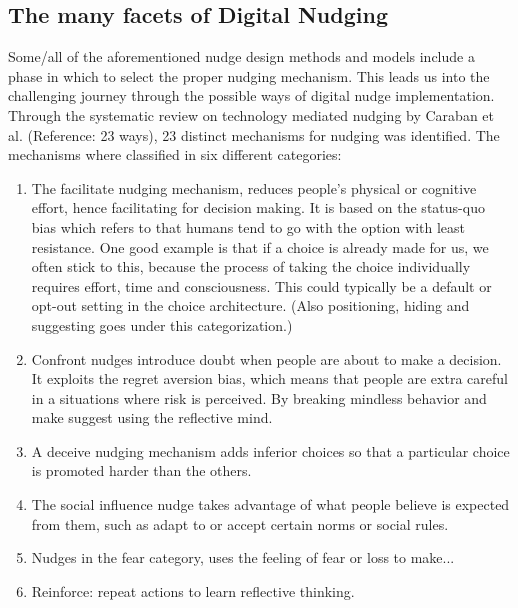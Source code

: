 
\subsection{The many facets of Digital Nudging}
Some/all of the aforementioned nudge design methods and models include a phase in which to select the proper nudging mechanism. This leads us into the challenging journey through the possible ways of digital nudge implementation. Through the systematic review on technology mediated nudging by Caraban et al. (Reference: 23 ways), 23 distinct mechanisms for nudging was identified. The mechanisms where classified in six different categories:

\begin{enumerate}
\item The facilitate nudging mechanism, reduces people's physical or cognitive effort, hence facilitating for decision making. It is based on the status-quo bias which refers to that humans tend to go with the option with least resistance. One good example is that if a choice is already made for us, we often stick to this, because the process of taking the choice individually requires effort, time and consciousness. This could typically be a default or opt-out setting in the choice architecture. (Also positioning, hiding and suggesting goes under this categorization.) 
\item Confront nudges introduce doubt when people are about to make a decision. It exploits the regret aversion bias, which means that people are extra careful in a situations where risk is perceived. By breaking mindless behavior and make suggest using the reflective mind. 
\item A deceive nudging mechanism adds inferior choices so that a particular choice is promoted harder than the others. 
\item The social influence nudge takes advantage of what people believe is expected from them, such as adapt to or accept certain norms or social rules. 
\item Nudges in the fear category, uses the feeling of fear or loss to make... 
\item Reinforce: repeat actions to learn reflective thinking. 
\end{enumerate}


